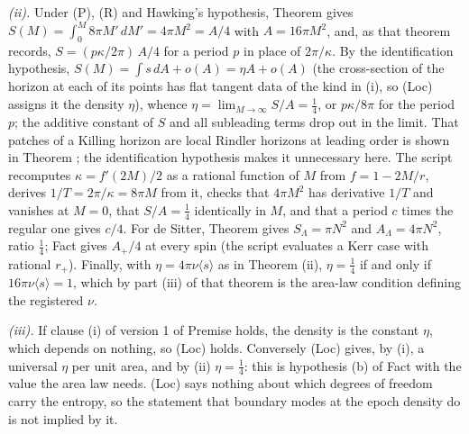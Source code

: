 \emph{(ii).} Under (P), (R) and Hawking's hypothesis, Theorem  gives $S(M) = \int_{0}^{M}8\pi M'\,dM' = 4\pi M^{2} = A/4$ with $A = 16\pi M^{2}$, and, as that theorem records, $S = (p\kappa/2\pi)\,A/4$ for a period $p$ in place of $2\pi/\kappa$. By the identification hypothesis, $S(M) = \int s\,dA + o(A) = \eta A + o(A)$ (the cross-section of the horizon at each of its points has flat tangent data of the kind in (i), so (Loc) assigns it the density $\eta$), whence $\eta = \lim_{M\to\infty}S/A = \tfrac14$, or $p\kappa/8\pi$ for the period $p$; the additive constant of $S$ and all subleading terms drop out in the limit. That patches of a Killing horizon are local Rindler horizons at leading order is shown in Theorem ; the identification hypothesis makes it unnecessary here. The script recomputes $\kappa = f'(2M)/2$ as a rational function of $M$ from $f = 1 - 2M/r$, derives $1/T = 2\pi/\kappa = 8\pi M$ from it, checks that $4\pi M^{2}$ has derivative $1/T$ and vanishes at $M = 0$, that $S/A = \tfrac14$ identically in $M$, and that a period $c$ times the regular one gives $c/4$. For de Sitter, Theorem  gives $S_{\Lambda} = \pi N^{2}$ and $A_{\Lambda} = 4\pi N^{2}$, ratio $\tfrac14$; Fact  gives $A_{+}/4$ at every spin (the script evaluates a Kerr case with rational $r_{+}$). Finally, with $\eta = 4\pi\nu\langle s\rangle$ as in Theorem (ii), $\eta = \tfrac14$ if and only if $16\pi\nu\langle s\rangle = 1$, which by part (iii) of that theorem is the area-law condition defining the registered $\nu$.

\emph{(iii).} If clause (i) of version 1 of Premise  holds, the density is the constant $\eta$, which depends on nothing, so (Loc) holds. Conversely (Loc) gives, by (i), a universal $\eta$ per unit area, and by (ii) $\eta = \tfrac14$: this is hypothesis (b) of Fact  with the value the area law needs. (Loc) says nothing about which degrees of freedom carry the entropy, so the statement that boundary modes at the epoch density do is not implied by it.

